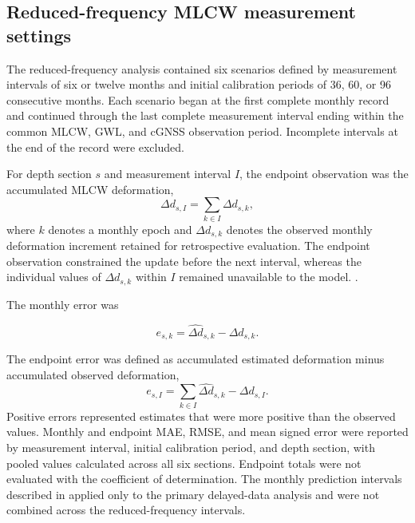 \subsection{Reduced-frequency MLCW measurement settings}
\label{app:sparse_measurement_settings}
\label{app:no_update_settings}

The reduced-frequency analysis contained six scenarios defined by measurement intervals of six or twelve months and initial calibration periods of 36, 60, or 96 consecutive months. Each scenario began at the first complete monthly record and continued through the last complete measurement interval ending within the common MLCW, GWL, and cGNSS observation period. Incomplete intervals at the end of the record were excluded.

For depth section $s$ and measurement interval $I$, the endpoint observation was the accumulated MLCW deformation,
\begin{equation}
\Delta d_{s,I}
=
\sum_{k\in I}\Delta d_{s,k},
\label{eq:interval_compaction}
\end{equation}
where $k$ denotes a monthly epoch and $\Delta d_{s,k}$ denotes the observed monthly deformation increment retained for retrospective evaluation. The endpoint observation constrained the update before the next interval, whereas the individual values of $\Delta d_{s,k}$ within $I$ remained unavailable to the model. .

The monthly error was

\begin{equation}
e_{s,k}
=
\widehat{\Delta d}_{s,k}
-
\Delta d_{s,k}.
\label{eq:appendix_monthly_error}
\end{equation}

The endpoint error was defined as accumulated estimated deformation minus accumulated observed deformation,
\begin{equation}
e_{s,I}
=
\sum_{k\in I}\widehat{\Delta d}_{s,k}
-
\Delta d_{s,I}.
\label{eq:endpoint_error}
\end{equation}
Positive errors represented estimates that were more positive than the observed values. Monthly and endpoint MAE, RMSE, and mean signed error were reported by measurement interval, initial calibration period, and depth section, with pooled values calculated across all six sections. Endpoint totals were not evaluated with the coefficient of determination. The monthly prediction intervals described in  applied only to the primary delayed-data analysis and were not combined across the reduced-frequency intervals.

\FloatBarrier

